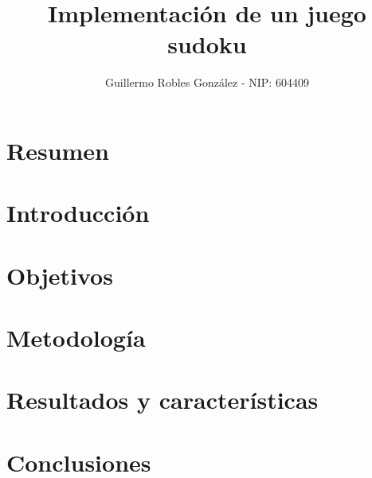 \documentclass[12pt,letterpaper]{article}
\title{Implementación de un juego sudoku} %
\author{Guillermo Robles González - NIP: 604409}
\begin{document}
\maketitle
\tableofcontents
\section{Resumen}

\section{Introducción}

\section{Objetivos}

\section{Metodología}

\section{Resultados y características}

\section{Conclusiones}
\end{document}
